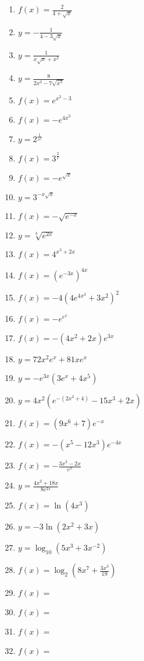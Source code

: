 \documentclass[a4paper,10pt]{article}
\begin{document}
\begin{multicols}{3}
\begin{enumerate}
\item $f(x) = \frac{2}{4 + \sqrt{x}}$
\item $y = -\frac{1}{4 - 3\sqrt{x}}$
\item $y = \frac{1}{x\sqrt{x} + x^2}$
\item $y = \frac{8}{2x^3 - 7\sqrt{x^3}}$

\item $f(x) = e^{x^2 - 3}$
\item $f(x) = -e^{4x^3}$
\item $y = 2^{\frac{1}{x^2}}$
\item $f(x) = 3^{\frac{2}{x}}$

\item $f(x) = -e^{\sqrt{x}}$
\item $y = 3^{-x\sqrt{x}}$
\item $f(x) = -\sqrt{e^{-x}}$
\item $y = \sqrt[3]{e^{2x}}$

\item $f(x) = 4^{x^3 + 2x}$
\item $f(x) = (e^{-3x})^{4x}$
\item $f(x) = -4(4e^{4x^3} + 3x^2)^2$
\item $f(x) = -e^{e^x}$

\item $f(x) = -(4x^2 + 2x)e^{3x}$
\item $y = 72x^2e^x + 81xe^x$
\item $y = -e^{3x}(3e^x + 4x^5)$
\item $y = 4x^2(e^{-(2x^2 + 4)} - 15x^3 + 2x)$


\item $f(x) = (9x^6 + 7)e^{-x}$
\item $f(x) = -(x^5 - 12x^3)e^{-4x}$
\item $f(x) = -\frac{3x^3 - 2x}{e^x}$
\item $y = \frac{4x^2 + 18x}{8e^{2x}}$

\item $f(x) = \ln(4x^3)$
\item $y = -3\ln(2x^2 + 3x)$
\item $y = \log_{10}(5x^3 + 3x^{-2})$
\item $f(x) = \log_2\left(8x^7 + \frac{3x^3}{19}\right)$

\item $f(x) = $
\item $f(x) = $
\item $f(x) = $
\item $f(x) = $


\end{enumerate}
\end{multicols}
\end{document}
